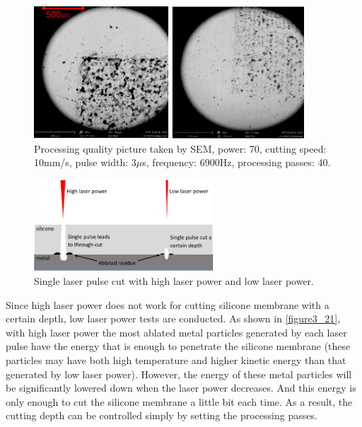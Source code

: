 \begin{figure}[t]%
\centering
\includegraphics[width=0.9\textwidth]{figures/designandfabrication/figure3_20}%
\caption{Processing quality picture taken by SEM, power: 70, cutting speed: 10mm/s, pulse width: 3$\mu$s, frequency: 6900Hz, processing passes: 40.}%
\label{figure3_20}%
\end{figure}

\begin{figure}[!b]%
\centering
\includegraphics[width=0.6\textwidth]{figures/designandfabrication/figure3_21}%
\caption{Single laser pulse cut with high laser power and low laser power.}%
\label{figure3_21}%
\end{figure}

Since high laser power does not work for cutting silicone membrane with a certain depth, low laser power tests are conducted. As shown in \autoref{figure3_21}, with high laser power the most ablated metal particles generated by each laser pulse have the energy that is enough to penetrate the silicone membrane (these particles may have both high temperature and higher kinetic energy than that generated by low laser power). However, the energy of these metal particles will be significantly lowered down when the laser power decreases. And this energy is only enough to cut the silicone membrane a little bit each time. As a result, the cutting depth can be controlled simply by setting the processing passes. \\



